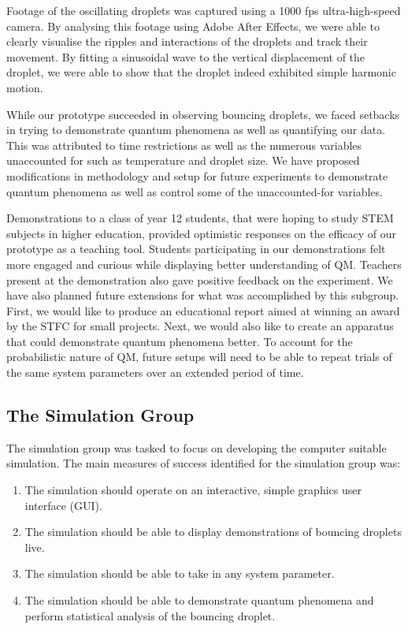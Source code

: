 Footage of the oscillating droplets was captured using a 1000 fps ultra-high-speed camera. By analysing this footage using Adobe After Effects, we were able to clearly visualise the ripples and interactions of the droplets and track their movement. By fitting a sinusoidal wave to the vertical displacement of the droplet, we were able to show that the droplet indeed exhibited simple harmonic motion. 

While our prototype succeeded in observing bouncing droplets, we faced setbacks in trying to demonstrate quantum phenomena as well as quantifying our data. This was attributed to time restrictions as well as the numerous variables unaccounted for such as temperature and droplet size. We have proposed modifications in methodology and setup for future experiments to demonstrate quantum phenomena as well as control some of the unaccounted-for variables.

Demonstrations to a class of year 12 students, that were hoping to study STEM subjects in higher education, provided optimistic responses on the efficacy of our prototype as a teaching tool. Students participating in our demonstrations felt more engaged and curious while displaying better understanding of QM. Teachers present at the demonstration also gave positive feedback on the experiment. 
We have also planned future extensions for what was accomplished by this subgroup. First, we would like to produce an educational report aimed at winning an award by the STFC for small projects. Next, we would also like to create an apparatus that could demonstrate quantum phenomena better. To account for the probabilistic nature of QM, future setups will need to be able to repeat trials of the same system parameters over an extended period of time.

\subsection*{The Simulation Group}
The simulation group was tasked to focus on developing the computer suitable simulation. The main measures of success identified for the simulation group was:

\begin{enumerate}
    \item The simulation should operate on an interactive, simple graphics user interface (GUI).
    \item The simulation should be able to display demonstrations of bouncing
droplets live.
    \item The simulation should be able to take in any system parameter.
\item The simulation should be able to demonstrate quantum phenomena and perform statistical analysis of the bouncing droplet. 
\end{enumerate}

